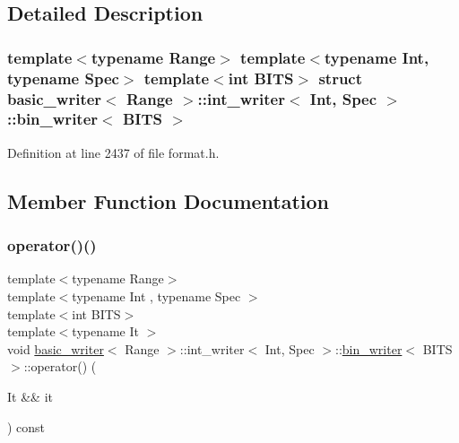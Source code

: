 \subsection{Detailed Description}
\subsubsection*{template$<$typename Range$>$\newline
template$<$typename Int, typename Spec$>$\newline
template$<$int B\+I\+TS$>$\newline
struct basic\+\_\+writer$<$ Range $>$\+::int\+\_\+writer$<$ Int, Spec $>$\+::bin\+\_\+writer$<$ B\+I\+T\+S $>$}



Definition at line 2437 of file format.\+h.



\subsection{Member Function Documentation}
\mbox{\label{structbasic__writer_1_1int__writer_1_1bin__writer_a6e186f22c8c7407268c6ff4f888e2234}} 
\subsubsection{\texorpdfstring{operator()()}{operator()()}}
{\footnotesize\ttfamily template$<$typename Range$>$ \\
template$<$typename Int , typename Spec $>$ \\
template$<$int B\+I\+TS$>$ \\
template$<$typename It $>$ \\
void \hyperlink{classbasic__writer}{basic\+\_\+writer}$<$ Range $>$\+::int\+\_\+writer$<$ Int, Spec $>$\+::\hyperlink{structbasic__writer_1_1int__writer_1_1bin__writer}{bin\+\_\+writer}$<$ B\+I\+TS $>$\+::operator() (\begin{DoxyParamCaption}\item[{It \&\&}]{it }\end{DoxyParamCaption}) const\hspace{0.3cm}{\ttfamily [inline]}}



